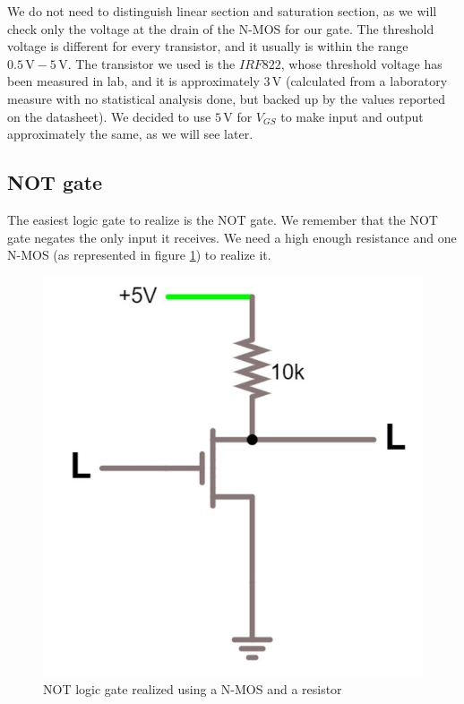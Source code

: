\documentclass{article}
\begin{document}
\vspace{3mm}

We do not need to distinguish linear section and saturation section, as we will check only the voltage at the drain of the N-MOS for our gate. The threshold voltage is different for every transistor, and it usually is within the range $0.5\,\textrm{V} - 5\,\textrm{V}$. The transistor we used is the $IRF822$, whose threshold voltage has been measured in lab, and it is approximately $3 \,\textrm{V}$ (calculated from a laboratory measure with no statistical analysis done, but backed up by the values reported on the datasheet). We decided to use $5\,\textrm{V}$ for $V_{GS}$ to make input and output approximately the same, as we will see later.


\clearpage


\subsection{NOT gate}

The easiest logic gate to realize is the NOT gate. We remember that the NOT gate negates the only input it receives. We need a high enough resistance and one N-MOS (as represented in figure \ref{NOT_N-MOS}) to realize it.

\begin{figure}[h]
    \centering
    \includegraphics[scale=0.3]{IM_NOT_NMOS.JPG}
    \caption{NOT logic gate realized using a N-MOS and a resistor}
    \label{NOT_N-MOS}
\end{figure}
\end{document}
